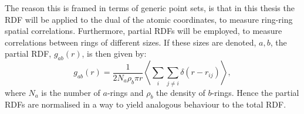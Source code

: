 The reason this is framed in terms of generic point sets, is that in this thesis the RDF will be applied to the dual of the atomic coordinates, to measure ring\--ring spatial correlations.
Furthermore, partial RDFs will be employed, to measure correlations between rings of different sizes.
If these sizes are denoted, $a,b$, the partial RDF, $g_{ab}\left(r\right)$, is then given by:
\begin{equation}
	g_{ab}\left(r\right)=\frac{1}{2 N_a \rho_b \pi r}\left\langle \sum_i \sum_{j\neq i} \delta\left(r-r_{ij}\right)\right\rangle, 
\end{equation} 
where $N_a$ is the number of $a$\--rings and $\rho_b$ the density of $b$\--rings.
Hence the partial RDFs are normalised in a way to yield analogous behaviour to the total RDF.



